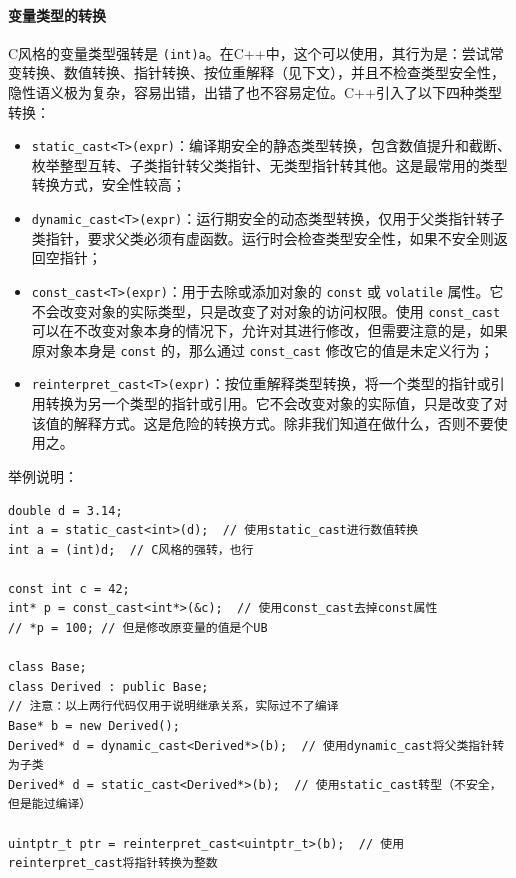 \paragraph{变量类型的转换}

C风格的变量类型强转是 \texttt{(int)a}。在C++中，这个可以使用，其行为是：尝试常变转换、数值转换、指针转换、按位重解释（见下文），并且不检查类型安全性，隐性语义极为复杂，容易出错，出错了也不容易定位。C++引入了以下四种类型转换：
\begin{itemize}
    \item \texttt{static_cast<T>(expr)}：编译期安全的静态类型转换，包含数值提升和截断、枚举整型互转、子类指针转父类指针、无类型指针转其他。这是最常用的类型转换方式，安全性较高；
    \item \texttt{dynamic_cast<T>(expr)}：运行期安全的动态类型转换，仅用于父类指针转子类指针，要求父类必须有虚函数。运行时会检查类型安全性，如果不安全则返回空指针；
    \item \texttt{const_cast<T>(expr)}：用于去除或添加对象的 \verb|const| 或 \verb|volatile| 属性。它不会改变对象的实际类型，只是改变了对对象的访问权限。使用 \verb|const_cast| 可以在不改变对象本身的情况下，允许对其进行修改，但需要注意的是，如果原对象本身是 \verb|const| 的，那么通过 \verb|const_cast| 修改它的值是未定义行为；
    \item \texttt{reinterpret_cast<T>(expr)}：按位重解释类型转换，将一个类型的指针或引用转换为另一个类型的指针或引用。它不会改变对象的实际值，只是改变了对该值的解释方式。这是危险的转换方式。除非我们知道在做什么，否则不要使用之。
\end{itemize}

举例说明：
\begin{verbatim}
double d = 3.14;
int a = static_cast<int>(d);  // 使用static_cast进行数值转换
int a = (int)d;  // C风格的强转，也行

const int c = 42;
int* p = const_cast<int*>(&c);  // 使用const_cast去掉const属性
// *p = 100; // 但是修改原变量的值是个UB

class Base;
class Derived : public Base;
// 注意：以上两行代码仅用于说明继承关系，实际过不了编译
Base* b = new Derived();
Derived* d = dynamic_cast<Derived*>(b);  // 使用dynamic_cast将父类指针转为子类
Derived* d = static_cast<Derived*>(b);  // 使用static_cast转型（不安全，但是能过编译）

uintptr_t ptr = reinterpret_cast<uintptr_t>(b);  // 使用reinterpret_cast将指针转换为整数
\end{verbatim}

